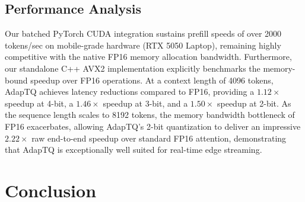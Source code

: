 \documentclass[sigconf]{acmart}
\begin{document}
\subsection{Performance Analysis}
Our batched PyTorch CUDA integration sustains prefill speeds of over 2000 tokens/sec on mobile-grade hardware (RTX 5050 Laptop), remaining highly competitive with the native FP16 memory allocation bandwidth. Furthermore, our standalone C++ AVX2 implementation explicitly benchmarks the memory-bound speedup over FP16 operations. At a context length of 4096 tokens, AdapTQ achieves latency reductions compared to FP16, providing a $1.12\times$ speedup at 4-bit, a $1.46\times$ speedup at 3-bit, and a $1.50\times$ speedup at 2-bit. As the sequence length scales to 8192 tokens, the memory bandwidth bottleneck of FP16 exacerbates, allowing AdapTQ's 2-bit quantization to deliver an impressive $2.22\times$ raw end-to-end speedup over standard FP16 attention, demonstrating that AdapTQ is exceptionally well suited for real-time edge streaming.

\section{Conclusion}



\end{document}
